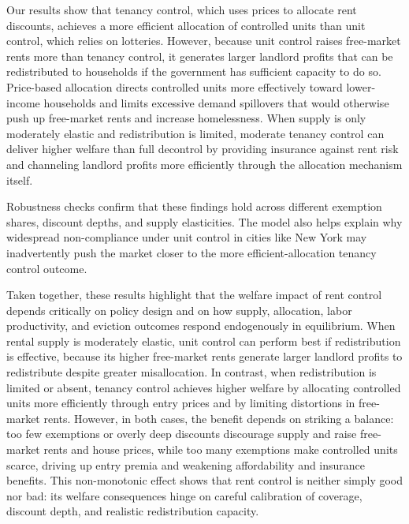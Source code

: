 \documentclass[parskip=full]{article}
\begin{document}
Our results show that tenancy control, which uses prices to allocate rent discounts, achieves a more efficient allocation of controlled units than unit control, which relies on lotteries. However, because unit control raises free-market rents more than tenancy control, it generates larger landlord profits that can be redistributed to households if the government has sufficient capacity to do so. Price-based allocation directs controlled units more effectively toward lower-income households and limits excessive demand spillovers that would otherwise push up free-market rents and increase homelessness. When supply is only moderately elastic and redistribution is limited, moderate tenancy control can deliver higher welfare than full decontrol by providing insurance against rent risk and channeling landlord profits more efficiently through the allocation mechanism itself.

Robustness checks confirm that these findings hold across different exemption shares, discount depths, and supply elasticities. The model also helps explain why widespread non-compliance under unit control in cities like New York may inadvertently push the market closer to the more efficient-allocation tenancy control outcome.

Taken together, these results highlight that the welfare impact of rent control depends critically on policy design and on how supply, allocation, labor productivity, and eviction outcomes respond endogenously in equilibrium. When rental supply is moderately elastic, unit control can perform best if redistribution is effective, because its higher free-market rents generate larger landlord profits to redistribute despite greater misallocation. In contrast, when redistribution is limited or absent, tenancy control achieves higher welfare by allocating controlled units more efficiently through entry prices and by limiting distortions in free-market rents. However, in both cases, the benefit depends on striking a balance: too few exemptions or overly deep discounts discourage supply and raise free-market rents and house prices, while too many exemptions make controlled units scarce, driving up entry premia and weakening affordability and insurance benefits. This non-monotonic effect shows that rent control is neither simply good nor bad: its welfare consequences hinge on careful calibration of coverage, discount depth, and realistic redistribution capacity.



\end{document}
